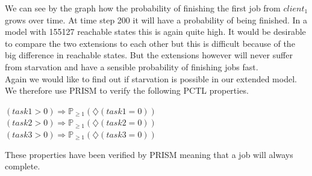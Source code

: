 \documentclass[12pt]{report}
\begin{document}
We can see by the graph how the probability of finishing the first job from $client_1$ grows over time. At time step 200 it will have a probability of being finished. In a model with 155127 reachable states this is again quite high. It would be desirable to compare the two extensions to each other but this is difficult because of the big difference in reachable states. But the extensions however will never suffer from starvation and have a sensible probability of finishing jobs fast.
\\Again we would like to find out if starvation is possible in our extended model. We therefore use PRISM to verify the following PCTL properties.
\begin{center}
$(task1 > 0) \Rightarrow \mathbb{P}_{\geq 1}(\diamondsuit(task1 = 0))$\\
$(task2 > 0) \Rightarrow \mathbb{P}_{\geq 1}(\diamondsuit(task2 = 0))$\\
$(task3 > 0) \Rightarrow \mathbb{P}_{\geq 1}(\diamondsuit(task3 = 0))$
\end{center}
These properties have been verified by PRISM meaning that a job will always complete.
\end{document}
